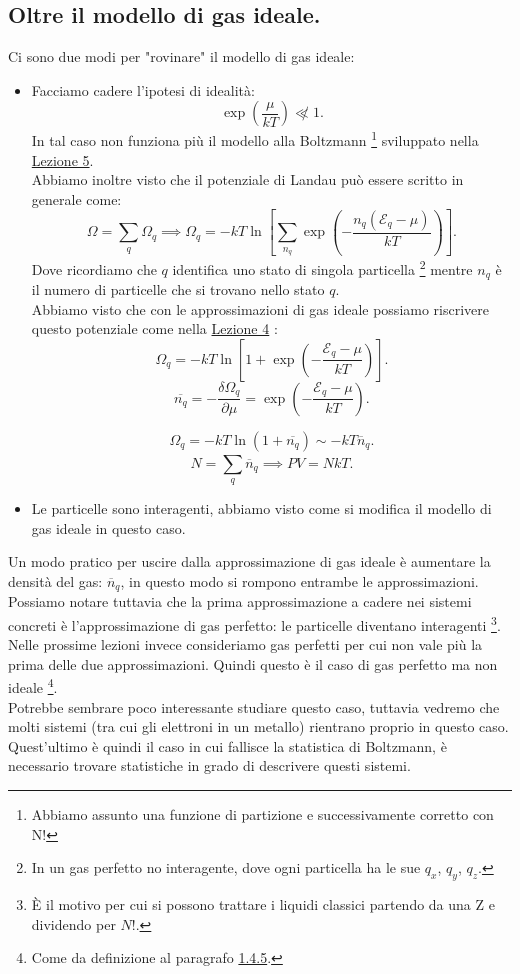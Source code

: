\subsection{Oltre il modello di gas ideale.}%
Ci sono due modi per "rovinare" il modello di gas ideale:
\begin{itemize}
	\item Facciamo cadere l'ipotesi di idealità:
	\[
		\exp\left( \frac{\mu }{kT} \right) \not\ll 1 
	.\] 
	In tal caso non funziona più il modello alla Boltzmann \footnote{Abbiamo assunto una funzione di partizione e successivamente corretto con N!} sviluppato nella \hyperref[eq:ideal_gas_approx]{Lezione 5}. \\
	Abbiamo inoltre visto che il potenziale di Landau può essere scritto in generale come:
	\[
		\Omega = \sum_{q}\Omega _{q} \implies \Omega _{q}=-kT
		\ln \left[ \sum_{n_{q}}^{} \exp\left( -\frac{n_{q}\left( \mathcal{E} _{q}-\mu  \right) }{kT} \right)  \right] 
	.\] 
	Dove ricordiamo che $q$ identifica uno stato di singola particella 
	\footnote{In un gas perfetto no interagente, dove ogni particella ha le sue $q_{x}$, $q_{y}$, $q_{z}$.} mentre $n_{q}$ è il numero di particelle che si trovano nello stato $q$.\\
	Abbiamo visto che con le approssimazioni di gas ideale possiamo riscrivere questo potenziale come nella \hyperref[eq:Landau_gas_ideale]{Lezione 4} :
	\[
		\Omega _{q} = - kT \ln \left[ 1+ \exp \left( - \frac{\mathcal{E} _{q}-\mu }{kT} \right)  \right] 
	.\]
	\[
		\overline{n_{q}} = - \frac{\delta \Omega _{q}}{\partial \mu } = \exp \left( - \frac{\mathcal{E} _{q}- \mu }{kT} \right) 	
	.\] 

\[
		\Omega _{q} = -kT \ln\left( 1+ \overline{n_{q}} \right) \sim -kT \overline{n}_{q}
	.\] 
	\[
		N = \sum_{q}^{} \overline{n}_{q} \implies PV = NkT
	.\] 
	\item Le particelle sono interagenti, abbiamo visto come si modifica il modello di gas ideale in questo caso.
\end{itemize}
Un modo pratico per uscire dalla approssimazione di gas ideale è aumentare la densità del gas: $\overline{n}_{q}$, in questo modo si rompono entrambe le approssimazioni. Possiamo notare tuttavia che la prima approssimazione a cadere nei sistemi concreti è l'approssimazione di gas perfetto: le particelle diventano interagenti \footnote{È il motivo per cui si possono trattare i liquidi classici partendo da una Z e dividendo per $N!$.}. \\
Nelle prossime lezioni invece consideriamo gas perfetti per cui non vale più la prima delle due approssimazioni. Quindi questo è il caso di gas perfetto ma non ideale \footnote{Come da definizione al paragrafo \hyperref[def:gas-ideale]{1.4.5}.}.\\
Potrebbe sembrare poco interessante studiare questo caso, tuttavia vedremo che molti sistemi (tra cui gli elettroni in un metallo) rientrano proprio in questo caso. Quest'ultimo è quindi il caso in cui fallisce la statistica di Boltzmann, è necessario trovare statistiche in grado di descrivere questi sistemi.\\

